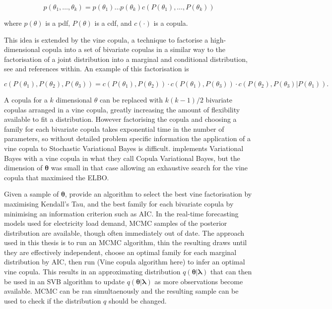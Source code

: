 \documentclass[12pt,a4paper]{article}%
\numberwithin{equation}{section}
\begin{document}
\begin{equation}
\label{vc1}
p(\theta_1, \dots, \theta_k) = p(\theta_1) \dots p(\theta_k) c(P(\theta_1), \dots, P(\theta_k))
\end{equation}

where $p(\theta)$ is a pdf, $P(\theta)$ is a cdf, and $c(\cdot)$ is a copula. 

This idea is extended by the vine copula, a technique to factorise a high-dimensional copula into a set of bivariate copulas in a similar way to the factorisation of a joint distribution into a marginal and conditional distribution, see \citet{Joe2014} and references within. An example of this factorisation is

\begin{equation}
\label{vc2}
c(P(\theta_1), P(\theta_2), P(\theta_3)) = c(P(\theta_1), P(\theta_2)) \cdot c(P(\theta_1), P(\theta_3)) \cdot c(P(\theta_2), P(\theta_3) | P(\theta_1)).
\end{equation}

A copula for a $k$ dimensional $\theta$ can be replaced with $k(k-1)/2$ bivariate copulas arranged in a vine copula, greatly increasing the amount of flexibility available to fit a distribution. However factorising the copula and choosing a family for each bivariate copula takes exponential time in the number of parameters, so without detailed problem specific information the application of a vine copula to Stochastic Variational Bayes is difficult. \citet{Tran2015} implements Variational Bayes with a vine copula in what they call Copula Variational Bayes, but the dimension of $\boldsymbol{\theta}$ was small in that case allowing an exhaustive search for the vine copula that maximised the ELBO. 

Given a sample of $\boldsymbol{\theta}$, \citet{Dissmann2013} provide an algorithm to select the best vine factorisation by maximising Kendall's Tau, and the best family for each bivariate copula by minimising an information criterion such as AIC. In the real-time forecasting models used for electricity load demand, MCMC samples of the posterior distribution are available, though often immediately out of date. The approach used in this thesis is to run an MCMC algorithm, thin the resulting draws until they are effectively independent, choose an optimal family for each marginal distribution by AIC, then run (Vine copula algorithm here) to infer an optimal vine copula. This results in an approximating distribution $q(\boldsymbol{\theta} | \boldsymbol{\lambda})$ that can then be used in an SVB algorithm to update $q(\boldsymbol{\theta} | \boldsymbol{\lambda})$ as more observations become available. MCMC can be ran simultaenously and the resulting sample can be used to check if the distribution $q$ should be changed. 
\end{document}
